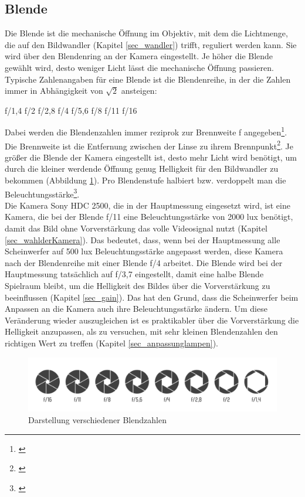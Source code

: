 \subsection{Blende}
\label{sec_blende}
Die Blende ist die mechanische Öffnung im Objektiv, mit dem die Lichtmenge, die auf den Bildwandler (Kapitel \ref{sec_wandler}) trifft, reguliert werden kann. Sie wird über den Blendenring an der Kamera eingestellt. Je höher die Blende gewählt wird, desto weniger Licht lässt die mechanische Öffnung passieren. Typische Zahlenangaben für eine Blende ist die Blendenreihe, in der die Zahlen immer in Abhängigkeit von $\sqrt{2}$ ansteigen: 
\begin{center}
 f/1,4  f/2  f/2,8  f/4  f/5,6  f/8  f/11  f/16\\
\end{center}
\noindent Dabei werden die Blendenzahlen immer reziprok zur Brennweite f angegeben\footnote{\cite[387]{schmidt}}. Die Brennweite ist die Entfernung zwischen der Linse zu ihrem Brennpunkt\footnote{\cite{rosko}}. Je größer die Blende der Kamera eingestellt ist, desto mehr Licht wird benötigt, um durch die kleiner werdende Öffnung genug Helligkeit für den Bildwandler zu bekommen (Abbildung \ref{b_blende}). Pro Blendenstufe halbiert bzw. verdoppelt man die Beleuchtungsstärke\footnote{\cite[388]{schmidt}}.\\
Die Kamera \glqq Sony HDC 2500\grqq , die in der Hauptmessung eingesetzt wird, ist eine Kamera, die bei der Blende f/11 eine Beleuchtungsstärke von 2000 lux benötigt, damit das Bild ohne Vorverstärkung das volle Videosignal nutzt (Kapitel \ref{sec_wahlderKamera}). Das bedeutet, dass, wenn bei der Hauptmessung alle Scheinwerfer auf 500 lux Beleuchtungsstärke angepasst werden, diese Kamera nach der Blendenreihe mit einer Blende f/4 arbeitet. Die Blende wird bei der Hauptmessung tatsächlich auf f/3,7 eingestellt, damit eine halbe Blende Spielraum bleibt, um die Helligkeit des Bildes über die Vorverstärkung zu beeinflussen (Kapitel \ref{sec_gain}). Das hat den Grund, dass die Scheinwerfer beim Anpassen an die Kamera auch ihre Beleuchtungsstärke ändern. Um diese Veränderung wieder auszugleichen ist es praktikabler über die Vorverstärkung die Helligkeit anzupassen, als zu versuchen, mit sehr kleinen Blendenzahlen den richtigen Wert zu treffen (Kapitel \ref{sec_anpassunglampen}).

\begin{figure}[htp]     %
\centering
\includegraphics[width=1.0\textwidth]{bilder/blende} 
\caption {Darstellung verschiedener Blendzahlen\protect\footnotemark}\label{b_blende}
\end{figure}


